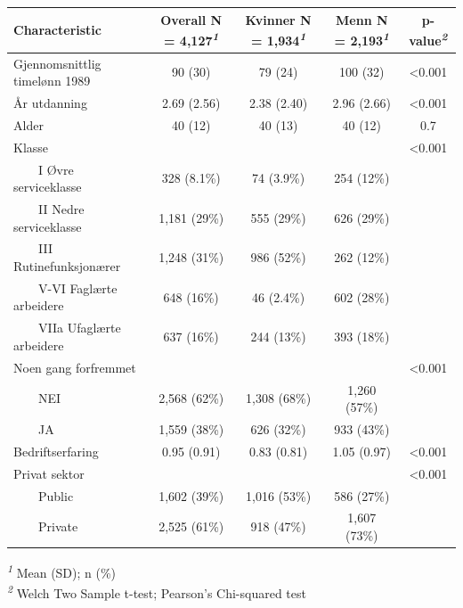 \documentclass[
  norsk,
  letterpaper,
  DIV=11,
  numbers=noendperiod]{scrreprt}
\theoremstyle{definition}
\theoremstyle{remark}
\begin{document}
\begin{table}
\fontsize{12.0pt}{14.0pt}\selectfont
\begin{tabular*}{\linewidth}{@{\extracolsep{\fill}}lcccc}
\toprule
\textbf{Characteristic} & \textbf{Overall}  N = 4,127\textsuperscript{\textit{1}} & \textbf{Kvinner}  N = 1,934\textsuperscript{\textit{1}} & \textbf{Menn}  N = 2,193\textsuperscript{\textit{1}} & \textbf{p-value}\textsuperscript{\textit{2}} \\ 
\midrule\addlinespace[2.5pt]
Gjennomsnittlig timelønn 1989 & 90 (30) & 79 (24) & 100 (32) & <0.001 \\ 
År utdanning & 2.69 (2.56) & 2.38 (2.40) & 2.96 (2.66) & <0.001 \\ 
Alder & 40 (12) & 40 (13) & 40 (12) & 0.7 \\ 
Klasse &  &  &  & <0.001 \\ 
    I Øvre serviceklasse & 328 (8.1\%) & 74 (3.9\%) & 254 (12\%) &  \\ 
    II Nedre serviceklasse & 1,181 (29\%) & 555 (29\%) & 626 (29\%) &  \\ 
    III Rutinefunksjonærer & 1,248 (31\%) & 986 (52\%) & 262 (12\%) &  \\ 
    V-VI Faglærte arbeidere & 648 (16\%) & 46 (2.4\%) & 602 (28\%) &  \\ 
    VIIa Ufaglærte arbeidere & 637 (16\%) & 244 (13\%) & 393 (18\%) &  \\ 
Noen gang forfremmet &  &  &  & <0.001 \\ 
    NEI & 2,568 (62\%) & 1,308 (68\%) & 1,260 (57\%) &  \\ 
    JA & 1,559 (38\%) & 626 (32\%) & 933 (43\%) &  \\ 
Bedriftserfaring & 0.95 (0.91) & 0.83 (0.81) & 1.05 (0.97) & <0.001 \\ 
Privat sektor &  &  &  & <0.001 \\ 
    Public & 1,602 (39\%) & 1,016 (53\%) & 586 (27\%) &  \\ 
    Private & 2,525 (61\%) & 918 (47\%) & 1,607 (73\%) &  \\ 
\bottomrule
\end{tabular*}
\begin{minipage}{\linewidth}
\vspace{.05em}
\textsuperscript{\textit{1}} Mean (SD); n (\%)\\
\textsuperscript{\textit{2}} Welch Two Sample t-test; Pearson's Chi-squared test\\
\end{minipage}
\end{table}
\end{document}
